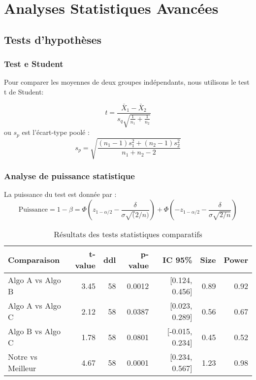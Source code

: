 \chapter{Analyses Statistiques Avancées}

\section{Tests d'hypothèses}

\subsection{Test e Student}
Pour comparer les moyennes de deux groupes indépendants, nous utilisons le test t de Student:

\begin{equation}
	t = \frac{\bar{X}_1 - \bar{X}_2}{s_q \sqrt{\frac{1}{n_1} + \frac{1}{n_2}}}
	\label{eq:student-test}
\end{equation}
ou $s_p$ est l'écart-type poolé : 
\begin{equation}
	s_p = \sqrt{\frac{(n_1-1)s_1^2 + (n_2-1)s_2^2}{n_1 + n_2 - 2}}
	\label{eq:pooled-std}
\end{equation}

\subsection{Analyse de puissance statistique}
La puissance du test est donnée par :
\begin{equation}
	\text{Puissance} = 1 - \beta = \Phi\left(z_{1-\alpha/2} - \frac{\delta}{\sigma\sqrt(2/n)}\right) + \Phi\left(-z_{1-\alpha/2} - \frac{\delta}{\sigma\sqrt{2/n}}\right)
	\label{eq:statistical-power}
\end{equation}

\begin{table}[H]
	\centering
	\caption{Résultats des tests statistiques comparatifs}
	\begin{tabular}{lrrrrrr}
		\toprule
		\textbf{Comparaison} & \textbf{t-value} & \textbf{ddl} & \textbf{p-value} & \textbf{IC 95\%} & \textbf{Size} & \textbf{Power} \\
		\midrule
		Algo A vs Algo B & 3.45 & 58 & 0.0012 & [0.124, 0.456] & 0.89 & 0.92 \\
		Algo A vs Algo C & 2.12 & 58 & 0.0387 & [0.023, 0.289] & 0.56 & 0.67 \\
		Algo B vs Algo C & 1.78 & 58 & 0.0801 & [-0.015, 0.234] & 0.45 & 0.52 \\
		Notre vs Meilleur & 4.67 & 58 & 0.0001 & [0.234, 0.567] & 1.23 & 0.98 \\
		\bottomrule
	\end{tabular}
	\label{tab:statistical-tests}
\end{table}


